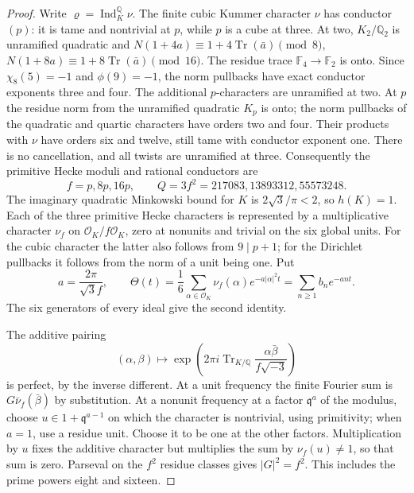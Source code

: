 \begin{proof}
Write $\varrho=\operatorname{Ind}_K^{\mathbb Q}\nu$.
The finite cubic Kummer character $\nu$ has conductor $(p)$:
it is tame and nontrivial at $p$, while $p$ is a cube at three.
At two, $K_2/\mathbb Q_2$ is unramified quadratic and
$N(1+4a)\equiv1+4\operatorname{Tr}(\bar a)\pmod8$,
$N(1+8a)\equiv1+8\operatorname{Tr}(\bar a)\pmod{16}$.
The residue trace $\mathbb F_4\to\mathbb F_2$ is onto.
Since $\chi_8(5)=-1$ and $\phi(9)=-1$, the norm pullbacks
have exact conductor exponents three and four.
The additional $p$-characters are unramified at two.
At $p$ the residue norm from the unramified quadratic $K_p$ is
onto; the norm pullbacks of the quadratic and quartic characters
have orders two and four.  Their products with $\nu$ have
orders six and twelve, still tame with conductor exponent one.
There is no cancellation, and all twists are unramified at three.
Consequently the primitive Hecke moduli and rational conductors are
\[
 f=p,8p,16p,\qquad Q=3f^2=217083,13893312,55573248.
 \tag{G147C.22}
\]
The imaginary quadratic Minkowski bound for $K$ is
$2\sqrt3/\pi<2$, so $h(K)=1$.
Each of the three primitive Hecke characters is represented by
a multiplicative character $\nu_f$ on $\mathcal O_K/f\mathcal O_K$,
zero at nonunits and trivial on the six global units.
For the cubic character the latter also follows from
$9\mid p+1$; for the Dirichlet pullbacks it follows from the norm
of a unit being one.  Put
\[
 a=\frac{2\pi}{\sqrt3f},\qquad
 \Theta(t)=\frac16\sum_{\alpha\in\mathcal O_K}
    \nu_f(\alpha)e^{-a|\alpha|^2t}
       =\sum_{n\ge1}b_ne^{-ant}.
 \tag{G147C.23}
\]
The six generators of every ideal give the second identity.

The additive pairing
\[
 (\alpha,\beta)\longmapsto
 \exp\left(2\pi i\operatorname{Tr}_{K/\mathbb Q}
                   \frac{\alpha\bar\beta}{f\sqrt{-3}}\right)
 \tag{G147C.24}
\]
is perfect, by the inverse different.  At a unit frequency the
finite Fourier sum is $G\bar\nu_f(\bar\beta)$ by substitution.
At a nonunit frequency at a factor $\mathfrak q^a$ of the modulus,
choose $u\in1+\mathfrak q^{a-1}$ on which the character is
nontrivial, using primitivity; when $a=1$, use a residue unit.
Choose it to be one at the other factors.  Multiplication by $u$
fixes the additive character but multiplies the sum by
$\nu_f(u)\ne1$, so that sum is zero.
Parseval on the $f^2$ residue classes gives $|G|^2=f^2$.
This includes the prime powers eight and sixteen.


\end{proof}
